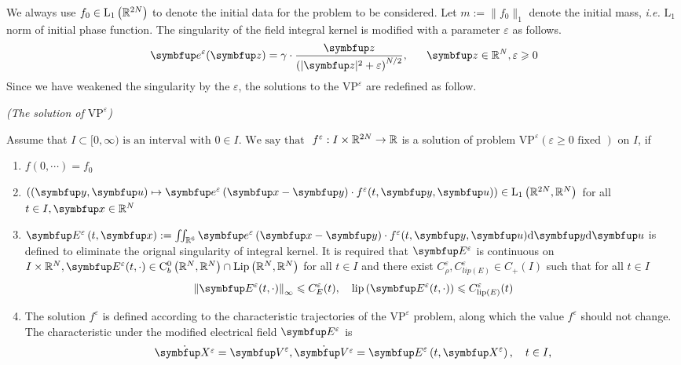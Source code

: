 We always use $f_{0} \in \mathrm{L}_{1}\left({\mathbb{R}}^{2 N}\right)$ to denote the initial data for the problem to be considered. Let $m:=\|f_{0}\|_{1}$ denote the initial mass, \textit{i.e.} $\mathrm{L}_1$ norm of initial phase function.
The singularity of the field integral kernel is modified with a parameter $\varepsilon$ as follows.
$$\vect{e}^{\varepsilon}(\vect{z})=\gamma \cdot \frac{\vect{z}}{\left(|\vect{z}|^{2}+\varepsilon\right)^{N / 2}},~ \quad ~ \vect{z} \in \bbR^{N}, \varepsilon \geqslant 0$$
Since we have weakened the singularity by the $\varepsilon$, the solutions to the $\text{VP}^\varepsilon$ are redefined as follow.
\begin{definition}\textit{(The solution of $\text{VP}^\varepsilon$)}

   Assume that $I \subset[0, \infty)\text { is an interval with } 0 \in I .\text { We say that }$ $f^{\varepsilon}: I \times {\mathbb{R}}^{2 N} \rightarrow {\mathbb{R}}$ is a solution of problem $\text{VP}^{\varepsilon}(\varepsilon \geqslant 0 \text { fixed })$ on $I$, if

    \begin{enumerate}[(1)] 
        \item $f(0,\cdots) = f_0$
        \item $\left((\vect{y},\vect{u}) \mapsto \vect{e}^{\varepsilon}\left(\vx-\vect{y}\right) \cdot f^{\varepsilon}(t, \vect{y},\vect{u})\right) \in \mathrm{L}_{1}\left(\bbR^{2 N}, \bbR^{N}\right)$ for all $t \in I, \vx \in \bbR^{N}$
        \item $\vE^{\varepsilon}\left(t, \vx\right):=\iint_{\bbR^6}  \vect{e}^{\varepsilon}\left(\vx-\vect{y}\right) \cdot f^{\varepsilon}(t, \vect{y},\vect{u}) \mathrm{d} \vect{y} \mathrm{d}\vect{u}$ is defined to eliminate the orignal singularity of integral kernel. It is required that $\vE^{\varepsilon}$ is continuous
        on $I \times \bbR^{N}, \vE^{\varepsilon}(t, \cdot) \in \mathrm{C}_{b}^{0}\left(\bbR^{N}, \bbR^{N}\right) \cap \operatorname{Lip}\left(\bbR^{N}, \bbR^{N}\right)$ for all $t \in I$ and there exist
        $C_\rho^{\varepsilon}, C_{lip(E)}^{\varepsilon} \in C_{+}(I)$ such that for all $t \in I$
        \[
        \left\|\vE^{\varepsilon}(t, \cdot)\right\|_{\infty} \leqslant C_{ E}^{\varepsilon}(t), \quad 
        \operatorname{lip}\left(\vE^{\varepsilon}(t, \cdot)\right) \leqslant C_{\operatorname{lip}(E)}^{\varepsilon}(t)
        \]
        \item 
        The solution $f^{\varepsilon}$ is defined according to the characteristic trajectories of the $\text{VP}^\varepsilon$ problem, along which the value $f^\varepsilon$ should not change. The characteristic under the modified electrical field $\vE^\varepsilon$ is 
        \begin{equation}
            \dot{\vect{X}^\varepsilon}=\vect{V}^\varepsilon, \dot{\vect{V}^\varepsilon}=\vE^{\varepsilon}\left(t, \vect{X}^\varepsilon\right), \quad t \in I,
        \end{equation}
        


\end{enumerate}
\end{definition}
